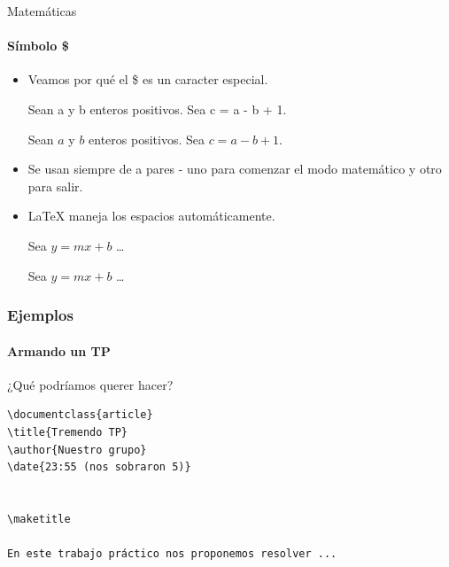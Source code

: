 \begin{frame}[fragile]{Matemáticas}
    \framesubtitle{Símbolo \$}
    \begin{itemize}
        \item Veamos por qué el \$ es un caracter especial.
        \small
        \begin{exampletwouptiny}
Sean a y b enteros positivos. 
Sea c = a - b + 1.

Sean $a$ y $b$ enteros positivos. 
Sea $c = a - b + 1$.
        \end{exampletwouptiny}
        \item Se usan siempre de a pares - uno para comenzar el modo matemático y otro para salir.
        \item \LaTeX{} maneja los espacios automáticamente.
            \begin{exampletwouptiny}
Sea $y=mx+b$ \ldots

Sea $y = m x + b$ \ldots
        \end{exampletwouptiny}
    \end{itemize}
\end{frame}


\begin{frame}[fragile]
\frametitle{Ejemplos}
\framesubtitle{Armando un TP}

¿Qué podríamos querer hacer?

\begin{lstlisting}[title={segundoTP.tex}]
\documentclass{article}
\title{Tremendo TP}
\author{Nuestro grupo}
\date{23:55 (nos sobraron 5)}


\maketitle

En este trabajo práctico nos proponemos resolver ...


\end{lstlisting}

\end{frame}

